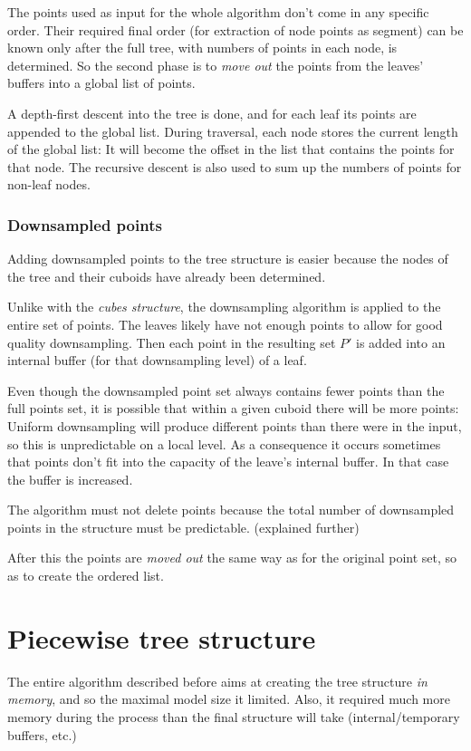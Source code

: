 \documentclass[a4paper,10pt,abstracton,notitlepage]{scrreprt}
\begin{document}
The points used as input for the whole algorithm don't come in any specific order. Their required final order (for extraction of node points as segment) can be known only after the full tree, with numbers of points in each node, is determined. So the second phase is to \emph{move out} the points from the leaves' buffers into a global list of points.

A depth-first descent into the tree is done, and for each leaf its points are appended to the global list. During traversal, each node stores the current length of the global list: It will become the offset in the list that contains the points for that node. The recursive descent is also used to sum up the numbers of points for non-leaf nodes.

\subsubsection{Downsampled points}
Adding downsampled points to the tree structure is easier because the nodes of the tree and their cuboids have already been determined.

Unlike with the \emph{cubes structure}, the downsampling algorithm is applied to the entire set of points. The leaves likely have not enough points to allow for good quality downsampling. Then each point in the resulting set $P'$ is added into an internal buffer (for that downsampling level) of a leaf.

Even though the downsampled point set always contains fewer points than the full points set, it is possible that within a given cuboid there will be more points: Uniform downsampling will produce different points than there were in the input, so this is unpredictable on a local level. As a consequence it occurs sometimes that points don't fit into the capacity of the leave's internal buffer. In that case the buffer is increased.

The algorithm must not delete points because the total number of downsampled points in the structure must be predictable. (explained further)

After this the points are \emph{moved out} the same way as for the original point set, so as to create the ordered list.


\section{Piecewise tree structure}
The entire algorithm described before aims at creating the tree structure \emph{in memory}, and so the maximal model size it limited. Also, it required much more memory during the process than the final structure will take (internal/temporary buffers, etc.)
\end{document}
